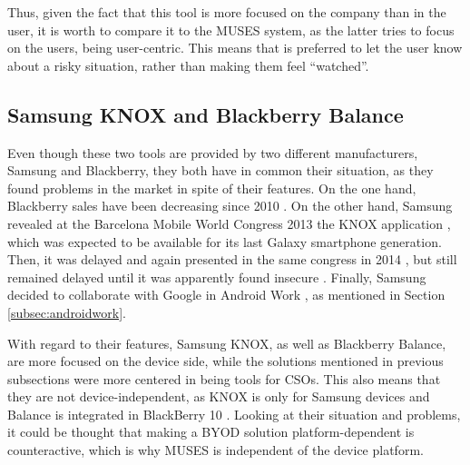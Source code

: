 Thus, given the fact that this tool is more focused on the company than in the user, it is worth to compare it to the MUSES system, as the latter tries to focus on the users, being user-centric. This means that is preferred to let the user know about a risky situation, rather than making them feel ``watched''. 


\subsection{Samsung KNOX and Blackberry Balance}
\label{subsec:samsungblackberry}

Even though these two tools are provided by two different manufacturers, Samsung and Blackberry, they both have in common their situation, as they found problems in the market in spite of their features. On the one hand, Blackberry sales have been decreasing since 2010 \cite{Blackberry_sales}.
On the other hand, Samsung revealed at the Barcelona Mobile World Congress 2013 the KNOX application \cite{Samsung_mwc13}, which was expected to be available for its last Galaxy smartphone generation. Then, it was delayed and again presented in the same congress in 2014 \cite{Samsung_mwc14}, but still remained delayed until it was apparently found insecure \cite{Samsung_insecure}. Finally, Samsung decided to collaborate with Google in Android Work \cite{Samsung_android}, as mentioned in Section \ref{subsec:androidwork}.

With regard to their features, Samsung KNOX, as well as Blackberry Balance, are more focused on the device side, while the solutions mentioned in previous subsections were more centered in being tools for CSOs. This also means that they are not device-independent, as KNOX is only for Samsung devices and Balance is integrated in BlackBerry 10 \cite{Blackberry_tool}. Looking at their situation and problems, it could be thought that making a BYOD solution platform-dependent is counteractive, which is why MUSES is independent of the device platform.

